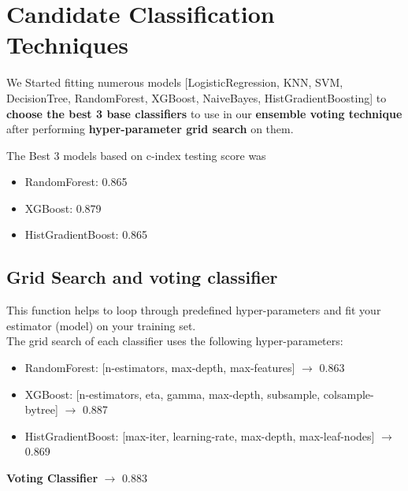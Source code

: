 \documentclass[5 pt]{article}
\begin{document}
\section{Candidate Classification Techniques}
We Started fitting numerous models [LogisticRegression, KNN, SVM, DecisionTree, RandomForest, XGBoost, NaiveBayes, HistGradientBoosting] to \textbf{choose the best 3 base classifiers} to use in our \textbf{ensemble voting technique} after performing \textbf{hyper-parameter grid search} on them. 


The Best 3 models based on c-index testing score was 
\begin{itemize}
    \item RandomForest: 0.865
    \item XGBoost: 0.879
    \item HistGradientBoost: 0.865
\end{itemize}

\subsection{Grid Search and voting classifier}
This function helps to loop through predefined hyper-parameters and fit your estimator (model) on your training set.\\

The grid search of each classifier uses the following hyper-parameters:

\begin{itemize}
    \item RandomForest: [n-estimators, max-depth, max-features] \(\longrightarrow\) 0.863
    \item XGBoost: [n-estimators, eta, gamma, max-depth, subsample, colsample-bytree]  \(\longrightarrow\) 0.887
    \item HistGradientBoost: [max-iter, learning-rate, max-depth, max-leaf-nodes]  \(\longrightarrow\) 0.869
\end{itemize}

\textbf{Voting Classifier} \(\longrightarrow\) 0.883



 
\end{document}
